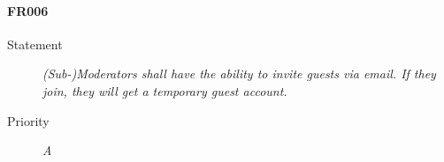 \paragraph{FR006}
  \begin{description}
  \item [Statement] 
    \textit{ (Sub-)Moderators shall have the ability to invite \gls{guest}s via email.
			If they join, they will get a temporary \gls{guest} account.}
  \item [Priority] \textit{A}
\end{description}